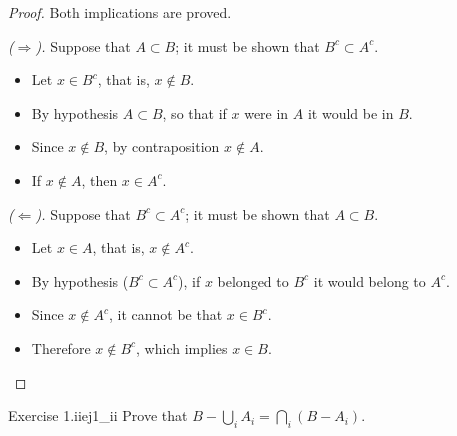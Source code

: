 \documentclass[11pt, a4paper]{article}
\begin{document}
\begin{proof}
Both implications are proved.

\textit{($\Rightarrow$).} Suppose that $A \subset B$; it must be shown that $B^c \subset A^c$.
\begin{itemize}
    \item Let $x \in B^c$, that is, $x \notin B$.
    \item By hypothesis $A \subset B$, so that if $x$ were in $A$ it would be in $B$.
    \item Since $x \notin B$, by contraposition $x \notin A$.
    \item If $x \notin A$, then $x \in A^c$.
\end{itemize}

\textit{($\Leftarrow$).} Suppose that $B^c \subset A^c$; it must be shown that $A \subset B$.
\begin{itemize}
    \item Let $x \in A$, that is, $x \notin A^c$.
    \item By hypothesis ($B^c \subset A^c$), if $x$ belonged to $B^c$ it would belong to $A^c$.
    \item Since $x \notin A^c$, it cannot be that $x \in B^c$.
    \item Therefore $x \notin B^c$, which implies $x \in B$.
\end{itemize}
\end{proof}

\begin{proposicion}{Exercise 1.ii}{ej1_ii}
Prove that $B - \bigcup_{i} A_i = \bigcap_{i} (B - A_i)$.
\end{proposicion}
\end{document}
